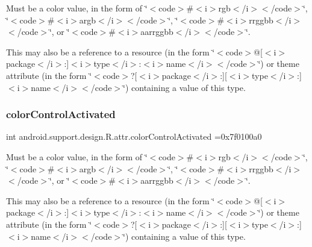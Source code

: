 Must be a color value, in the form of \char`\"{}$<$code$>$\#$<$i$>$rgb$<$/i$>$$<$/code$>$\char`\"{}, \char`\"{}$<$code$>$\#$<$i$>$argb$<$/i$>$$<$/code$>$\char`\"{}, \char`\"{}$<$code$>$\#$<$i$>$rrggbb$<$/i$>$$<$/code$>$\char`\"{}, or \char`\"{}$<$code$>$\#$<$i$>$aarrggbb$<$/i$>$$<$/code$>$\char`\"{}. 

This may also be a reference to a resource (in the form \char`\"{}$<$code$>$@\mbox{[}$<$i$>$package$<$/i$>$\+:\mbox{]}$<$i$>$type$<$/i$>$\+:$<$i$>$name$<$/i$>$$<$/code$>$\char`\"{}) or theme attribute (in the form \char`\"{}$<$code$>$?\mbox{[}$<$i$>$package$<$/i$>$\+:\mbox{]}\mbox{[}$<$i$>$type$<$/i$>$\+:\mbox{]}$<$i$>$name$<$/i$>$$<$/code$>$\char`\"{}) containing a value of this type. \mbox{\label{classandroid_1_1support_1_1design_1_1R_1_1attr_aa2f7d231aef973a9d4c53d7e334f5467}} 
\subsubsection{\texorpdfstring{color\+Control\+Activated}{colorControlActivated}}
{\footnotesize\ttfamily int android.\+support.\+design.\+R.\+attr.\+color\+Control\+Activated =0x7f0100a0\hspace{0.3cm}{\ttfamily [static]}}

Must be a color value, in the form of \char`\"{}$<$code$>$\#$<$i$>$rgb$<$/i$>$$<$/code$>$\char`\"{}, \char`\"{}$<$code$>$\#$<$i$>$argb$<$/i$>$$<$/code$>$\char`\"{}, \char`\"{}$<$code$>$\#$<$i$>$rrggbb$<$/i$>$$<$/code$>$\char`\"{}, or \char`\"{}$<$code$>$\#$<$i$>$aarrggbb$<$/i$>$$<$/code$>$\char`\"{}. 

This may also be a reference to a resource (in the form \char`\"{}$<$code$>$@\mbox{[}$<$i$>$package$<$/i$>$\+:\mbox{]}$<$i$>$type$<$/i$>$\+:$<$i$>$name$<$/i$>$$<$/code$>$\char`\"{}) or theme attribute (in the form \char`\"{}$<$code$>$?\mbox{[}$<$i$>$package$<$/i$>$\+:\mbox{]}\mbox{[}$<$i$>$type$<$/i$>$\+:\mbox{]}$<$i$>$name$<$/i$>$$<$/code$>$\char`\"{}) containing a value of this type. \mbox{\label{classandroid_1_1support_1_1design_1_1R_1_1attr_acdaa061c93eac490ef28917ae15d14c6}} 
